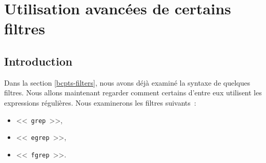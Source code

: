 %
%

\setcounter{remarque-cnt}{1}
\setcounter{example-cnt}{1}
\chapter{\label{adv-filters}Utilisation avanc{\'e}es de certains filtres}
\thispagestyle{fancy}

\section{Introduction}

Dans la section \ref{bcpts-filters}, nous avons d{\'e}j{\`a} examin{\'e} la syntaxe de quelques filtres. Nous allons maintenant regarder comment certains d'entre eux utilisent les expressions r{\'e}guli{\`e}res. Nous examinerons les filtres suivants~:
\begin{itemize}
	\item	<<~{\tt grep}~>>,
	\item	<<~{\tt egrep}~>>,
	\item	<<~{\tt fgrep}~>>.
\end{itemize}

